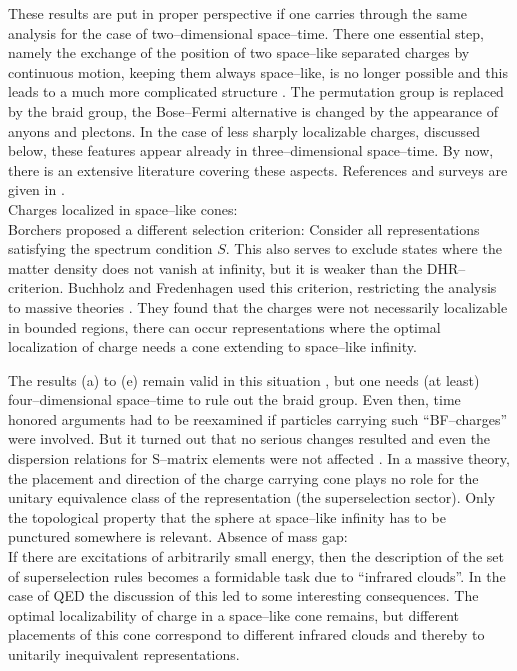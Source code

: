 These results are put in proper perspective 
if one carries through the same analysis for the 
case  of two--dimensional space--time. There one essential step,
namely the exchange of the position of two space--like separated 
charges by continuous motion, keeping them always space--like, is 
no longer possible and this leads to a much more complicated 
structure \cite{FrReSch,Fro}.
The permutation group is replaced by the
braid group, the Bose--Fermi alternative is changed by the
appearance of anyons and plectons. In the case of less sharply
localizable charges, discussed below, these features appear already
in three--dimensional space--time. By now, there is an extensive 
literature covering these aspects. References and surveys are given in
\cite{Ka,Sch1}. \\[2mm]
{\noindent \subsect Charges localized in space--like cones:} \\[2mm]
Borchers proposed a different selection criterion: Consider all
representations satisfying the spectrum condition $S$. This
also serves to exclude states where the matter density does not vanish at
infinity, but it is weaker than the DHR--criterion. Buchholz and
Fredenhagen used this criterion, restricting the analysis to massive
theories \cite{BuFr}. They found that 
the charges were not necessarily localizable in bounded
regions, there can occur representations where the optimal
localization of charge needs a cone extending to space--like
infinity. 

The results (a) to (e) remain valid in this 
situation \cite{BuFr,DoRo}, but one needs (at least) four--dimensional
space--time to rule out the braid group. Even then, time
honored arguments had to be reexamined if particles carrying such
``BF--charges'' were involved. But it turned out that no serious
changes resulted and even the dispersion relations for S--matrix
elements were not affected \cite{BrEp}. In a massive theory, 
the placement and direction of
the charge carrying cone plays no role for the unitary equivalence 
class of the representation (the superselection sector).
Only the topological property that the sphere at space--like
infinity has to be punctured somewhere is relevant.\newpage 
{\noindent \subsect Absence of mass gap:}\\[2mm] If there 
are excitations of arbitrarily small energy, then the
description of the set of  superselection rules becomes a formidable
task due to ``infrared clouds''. In the case of QED the discussion of
this \cite{Bu2} led to some interesting consequences. The optimal
localizability of charge in a space--like cone remains, but different
placements of this cone correspond to different infrared clouds and
thereby to unitarily inequivalent representations. 

